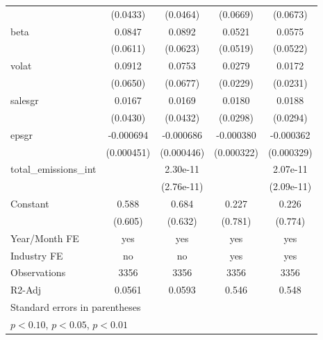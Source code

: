 \begin{table}[htbp]
\begin{tabular}{l*{4}{c}}
                    &    (0.0433)         &    (0.0464)         &    (0.0669)         &    (0.0673)         \\
[1em]
beta                &      0.0847         &      0.0892         &      0.0521         &      0.0575         \\
                    &    (0.0611)         &    (0.0623)         &    (0.0519)         &    (0.0522)         \\
[1em]
volat               &      0.0912         &      0.0753         &      0.0279         &      0.0172         \\
                    &    (0.0650)         &    (0.0677)         &    (0.0229)         &    (0.0231)         \\
[1em]
salesgr             &      0.0167         &      0.0169         &      0.0180         &      0.0188         \\
                    &    (0.0430)         &    (0.0432)         &    (0.0298)         &    (0.0294)         \\
[1em]
epsgr               &   -0.000694         &   -0.000686         &   -0.000380         &   -0.000362         \\
                    &  (0.000451)         &  (0.000446)         &  (0.000322)         &  (0.000329)         \\
[1em]
total\_emissions\_int &                     &    2.30e-11         &                     &    2.07e-11         \\
                    &                     &  (2.76e-11)         &                     &  (2.09e-11)         \\
[1em]
Constant            &       0.588         &       0.684         &       0.227         &       0.226         \\
                    &     (0.605)         &     (0.632)         &     (0.781)         &     (0.774)         \\
\hline
Year/Month FE       &         yes         &         yes         &         yes         &         yes         \\
Industry FE         &          no         &          no         &         yes         &         yes         \\
Observations        &        3356         &        3356         &        3356         &        3356         \\
R2-Adj              &      0.0561         &      0.0593         &       0.546         &       0.548         \\
\hline\hline
\multicolumn{5}{l}{\footnotesize Standard errors in parentheses}\\
\multicolumn{5}{l}{\footnotesize \sym{*} \(p<0.10\), \sym{**} \(p<0.05\), \sym{***} \(p<0.01\)}\\
\end{tabular}
\end{table}
